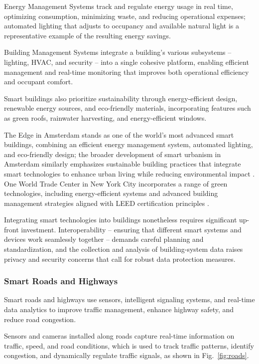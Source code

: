 \documentclass[journal]{IEEEtran}
\begin{document}
Energy Management Systems track and regulate energy usage in real time, optimizing consumption, minimizing waste, and reducing operational expenses; automated lighting that adjusts to occupancy and available natural light is a representative example of the resulting energy savings.

Building Management Systems integrate a building's various subsystems -- lighting, HVAC, and security -- into a single cohesive platform, enabling efficient management and real-time monitoring that improves both operational efficiency and occupant comfort.

Smart buildings also prioritize sustainability through energy-efficient design, renewable energy sources, and eco-friendly materials, incorporating features such as green roofs, rainwater harvesting, and energy-efficient windows.

The Edge in Amsterdam stands as one of the world's most advanced smart buildings, combining an efficient energy management system, automated lighting, and eco-friendly design; the broader development of smart urbanism in Amsterdam similarly emphasizes sustainable building practices that integrate smart technologies to enhance urban living while reducing environmental impact \cite{r46}. One World Trade Center in New York City incorporates a range of green technologies, including energy-efficient systems and advanced building management strategies aligned with LEED certification principles \cite{r47}.

Integrating smart technologies into buildings nonetheless requires significant up-front investment. Interoperability -- ensuring that different smart systems and devices work seamlessly together -- demands careful planning and standardization, and the collection and analysis of building-system data raises privacy and security concerns that call for robust data protection measures.

\subsubsection{Smart Roads and Highways}
Smart roads and highways use sensors, intelligent signaling systems, and real-time data analytics to improve traffic management, enhance highway safety, and reduce road congestion.

Sensors and cameras installed along roads capture real-time information on traffic, speed, and road conditions, which is used to track traffic patterns, identify congestion, and dynamically regulate traffic signals, as shown in Fig.~\ref{fig:roads}.
\end{document}
